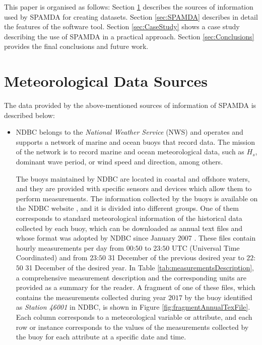 \documentclass[energies,article,accept,moreauthors,pdftex]{Definitions/mdpi}
\begin{document}
		This paper is organised as follows: Section \ref{sec:DataSources} describes the sources of information used by SPAMDA for creating datasets. Section \ref{sec:SPAMDA} describes in detail the features of the software tool. Section \ref{sec:CaseStudy} shows a case study describing the use of SPAMDA in a practical approach. Section \ref{sec:Conclusions} provides the final conclusions and future work.
		
	\section{Meteorological Data Sources}\label{sec:DataSources}
		
		The data provided by the above-mentioned sources of information of SPAMDA is described below:
		\begin{itemize}
						
			\item NDBC belongs to the \textit{National Weather Service} (NWS) and operates and supports a network of marine and ocean buoys that record data. The mission of the network is to record marine and ocean meteorological data, such as $H_s$, dominant wave period, or wind speed and direction, among others.

			The buoys maintained by NDBC are located in coastal and offshore waters, and they are provided with specific sensors and devices which allow them to perform measurements. The information collected by the buoys is available on the NDBC website \cite{NOAA_1}, and it is divided into different groups. One of them corresponds to standard meteorological information of the historical data collected by each buoy, which can be downloaded as annual text files and whose format was adopted by NDBC since January 2007 \cite {NOAA_2}. These files contain hourly measurements per day from $00$:$50$ to $23$:$50$ UTC (Universal Time Coordinated) and from $23$:$50$ 31 December of the previous desired year to $22$:$50$ 31 December of the desired year. In Table \ref{tab:measurementsDescription}, a comprehensive measurement description and the corresponding units are provided as a summary for the reader. A fragment of one of these files, which contains the measurements collected during year $2017$ by the buoy identified as \textit{Station 46001} in NDBC, is shown in Figure \ref{fig:fragmentAnnualTexFile}. Each column corresponds to a meteorological variable or attribute, and each row or instance corresponds to the values of the measurements collected by the buoy for each attribute at a specific date and time.


\end{itemize}
\end{document}
